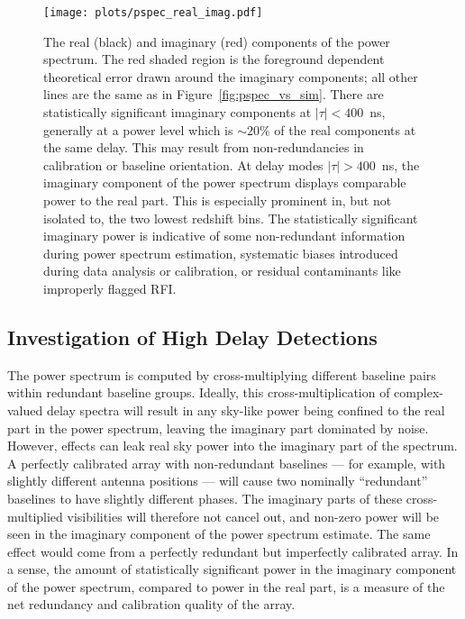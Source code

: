 \begin{figure}[tp]
\centering
\texttt{[image: plots/pspec\_real\_imag.pdf]}
\caption{The real (black) and imaginary (red) components of the
power spectrum. The red shaded region is the 
foreground dependent theoretical error drawn around the 
imaginary components; all other lines are the same as in Figure~\ref{fig:pspec_vs_sim}. There are statistically significant imaginary components at
$ |\tau| < 400 $~ns, generally at a power level
which is $ \sim 20\% $ of the real components at the same delay.
This may result from non-redundancies in calibration or baseline orientation. At delay modes $ |\tau| > 400 $~ns, the imaginary
component of the power spectrum displays comparable power to the 
real part. This is especially prominent in, but not isolated to, the two lowest redshift bins. The statistically significant imaginary power is indicative of some non-redundant information 
during power spectrum estimation, systematic biases introduced during data analysis or calibration, 
or residual contaminants like improperly flagged RFI.
}
\label{fig:real_imag}
\end{figure}

\subsection{Investigation of High Delay Detections}

The power spectrum is computed by cross-multiplying
different baseline pairs within redundant baseline groups.
Ideally, this cross-multiplication of complex-valued
delay spectra will result in any sky-like power being confined to the real part in the power spectrum, leaving the imaginary part dominated by noise.
However, effects can leak real sky power into the
imaginary part of the spectrum.
A perfectly calibrated array with non-redundant baselines
--- for example, with slightly different antenna positions ---
will cause two nominally ``redundant'' baselines to have slightly different phases.
The imaginary parts of these cross-multiplied visibilities will therefore not cancel out, and non-zero power will be seen in the imaginary component of the power spectrum estimate.
The same effect would come from a perfectly redundant but imperfectly calibrated array.
In a sense, the amount of statistically significant power in the imaginary component of the power spectrum, compared to power in the real part, is a measure of the net redundancy and calibration quality of the array.

